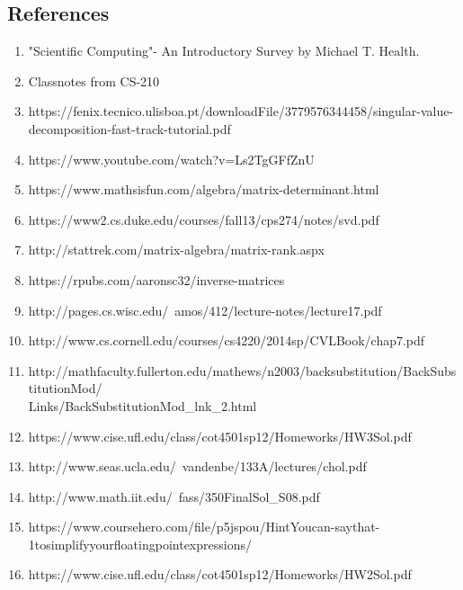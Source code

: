 \documentclass[12pt, oneside]{article}   	%
\begin{document}
\vspace{1cm}
\subsection*{ \Large References}
\begin{enumerate}
	\item "Scientific Computing"- An Introductory Survey by Michael T. Health.
	\item Classnotes from CS-210
	\item https://fenix.tecnico.ulisboa.pt/downloadFile/3779576344458/singular-value-decomposition-fast-track-tutorial.pdf
	\item https://www.youtube.com/watch?v=Ls2TgGFfZnU
	\item https://www.mathsisfun.com/algebra/matrix-determinant.html
	\item https://www2.cs.duke.edu/courses/fall13/cps274/notes/svd.pdf
		\item http://stattrek.com/matrix-algebra/matrix-rank.aspx
		\item https://rpubs.com/aaronsc32/inverse-matrices
		\item http://pages.cs.wisc.edu/~amos/412/lecture-notes/lecture17.pdf
		\item http://www.cs.cornell.edu/courses/cs4220/2014sp/CVLBook/chap7.pdf
		\item http://mathfaculty.fullerton.edu/mathews/n2003/backsubstitution/BackSubstitutionMod/\\Links/BackSubstitutionMod\_lnk\_2.html
		\item https://www.cise.ufl.edu/class/cot4501sp12/Homeworks/HW3Sol.pdf
		\item http://www.seas.ucla.edu/~vandenbe/133A/lectures/chol.pdf
		\item http://www.math.iit.edu/~fass/350FinalSol\_S08.pdf
		\item https://www.coursehero.com/file/p5jspou/Hint\-You\-can-say\-that\--1\-to\-simplify\-your\-floating\-point\-expressions/
		
		\item https://www.cise.ufl.edu/class/cot4501sp12/Homeworks/HW2Sol.pdf
		
\end{enumerate}
\end{document}
